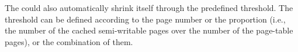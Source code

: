 The \cache could also automatically shrink itself through the predefined threshold.
The threshold can be defined according to the page number or the proportion (i.e., the number of the cached semi-writable pages over the number of the page-table pages), or the combination of them.






